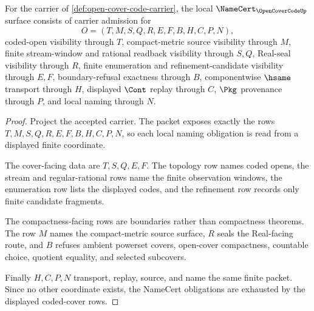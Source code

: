 \begin{theorem}
\label{thm:open-cover-code-namecert-obligations}
For the carrier of \autoref{def:open-cover-code-carrier}, the local $\NameCert_{\OpenCoverCodeUp}$ surface consists of carrier admission for
$$
O=(T,M,S,Q,R,E,F,B,H,C,P,N),
$$
coded-open visibility through $T$, compact-metric source visibility through $M$, finite stream-window and rational readback visibility through $S,Q$, Real-seal visibility through $R$, finite enumeration and refinement-candidate visibility through $E,F$, boundary-refusal exactness through $B$, componentwise $\hsame$ transport through $H$, displayed $\Cont$ replay through $C$, $\Pkg$ provenance through $P$, and local naming through $N$.
\end{theorem}
\begin{proof}
Project the accepted carrier. The packet exposes exactly the rows $T,M,S,Q,R,E,F,B,H,C,P,N$, so each local naming obligation is read from a displayed finite coordinate.

The cover-facing data are $T,S,Q,E,F$. The topology row names coded opens, the stream and regular-rational rows name the finite observation windows, the enumeration row lists the displayed codes, and the refinement row records only finite candidate fragments.

The compactness-facing rows are boundaries rather than compactness theorems. The row $M$ names the compact-metric source surface, $R$ seals the Real-facing route, and $B$ refuses ambient powerset covers, open-cover compactness, countable choice, quotient equality, and selected subcovers.

Finally $H,C,P,N$ transport, replay, source, and name the same finite packet. Since no other coordinate exists, the NameCert obligations are exhausted by the displayed coded-cover rows.
\end{proof}

